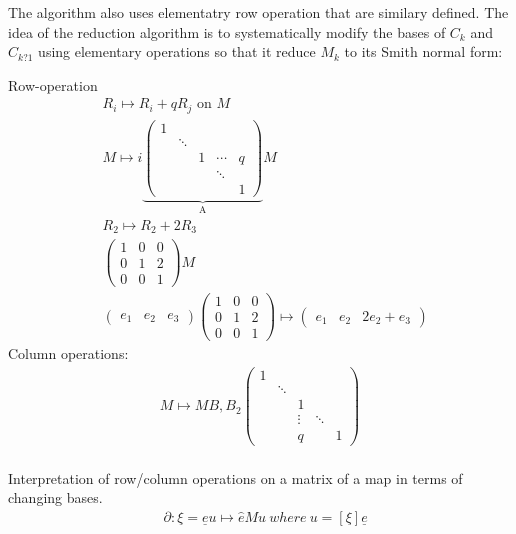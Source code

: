 \documentclass[11pt,a4paper]{report}
\begin{document}
                The algorithm also uses elementatry row operation that are similary defined. The idea of the reduction algorithm is to systematically modify the bases of $C_k$ and $C_{k?1}$ using elementary operations so that it reduce $M_k$ to its Smith normal form:
                
              Row-operation
              \begin{align*}
                &R_i \mapsto R_i + qR_j \textrm{ on } M\\
                &M \mapsto i\underbrace{\begin{pmatrix}1&&&& \\ & \ddots &&& \\ && 1 & \cdots & q \\ &&& \ddots & \\ &&&& 1 \end{pmatrix}}_\text{A} M\\
                &R_2 \mapsto R_2 + 2R_3\\
                &\begin{pmatrix}1&0&0\\0&1&2\\0&0&1\end{pmatrix} M\\
                &\begin{pmatrix}e_1 & e_2 & e_3\end{pmatrix}\begin{pmatrix}1&0&0\\0&1&2\\0&0&1\end{pmatrix} \mapsto \begin{pmatrix}e_1 & e_2 & 2e_2 + e_3\end{pmatrix}
              \end{align*}
              Column operations:
              \begin{align*}
                M \mapsto MB, B_2\begin{pmatrix}1&&&& \\ & \ddots &&& \\ && 1 && \\ && \vdots & \ddots & \\ && q && 1 \end{pmatrix}
              \end{align*}
              \\
              Interpretation of row/column operations on a matrix of a map in terms of changing bases.
              \begin{align*}
                &\partial: \xi = \underline{e}u \mapsto \hat{e} M u
                \ where\ u = [\xi]\underline{e}
              \end{align*}
\end{document}

